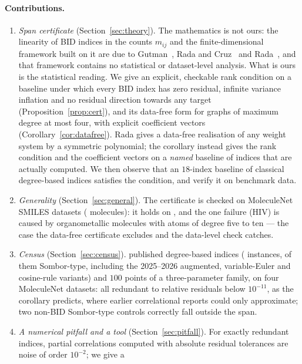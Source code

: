 \documentclass[11pt,a4paper]{article}
\theoremstyle{definition}
\begin{document}
\paragraph{Contributions.}
\begin{enumerate}[label=(\arabic*)]
\item \emph{Span certificate} (Section~\ref{sec:theory}). The
mathematics is not ours: the linearity of BID indices in the counts
$m_{ij}$ and the finite-dimensional framework built on it are due to
Gutman~\cite{Gutman2013Degree}, Rada and
Cruz~\cite{RadaCruz2014VDB} and Rada~\cite{Rada2026LinearVDB}, and that
framework contains no statistical or dataset-level analysis. What is
ours is the statistical reading. We give an explicit, checkable rank
condition on a baseline under which every BID index has zero residual,
infinite variance inflation and no residual direction towards any
target (Proposition~\ref{prop:cert}), and its data-free form for
graphs of maximum degree at most four, with explicit coefficient
vectors (Corollary~\ref{cor:datafree}). Rada gives a data-free
realisation of any weight system by a symmetric polynomial; the
corollary instead gives the rank condition and the coefficient vectors
on a \emph{named} baseline of indices that are actually computed. We
then observe that an $18$-index baseline of classical degree-based
indices satisfies the condition, and verify it on benchmark data.
\item \emph{Generality} (Section~\ref{sec:general}). The certificate
is checked on \nGenDatasets{} MoleculeNet SMILES datasets
(\nGenMolecules{} molecules): it holds on \nGenCertified{}, and the one
failure (HIV) is caused by \hivHyper{} organometallic molecules with
atoms of degree five to ten --- the case the data-free certificate
excludes and the data-level check catches.
\item \emph{Census} (Section~\ref{sec:census}). \nCensusIdx{} published
degree-based indices (\nCensusInst{} instances, \nSomborInst{} of them
Sombor-type, including the 2025--2026 augmented, variable-Euler and
cosine-rule variants) and $100$ points of a three-parameter family, on
four MoleculeNet datasets: all redundant to relative residuals below
$10^{-11}$, as the corollary predicts, where earlier correlational
reports could only approximate; two non-BID Sombor-type controls
correctly fall outside the span.
\item \emph{A numerical pitfall and a tool} (Section~\ref{sec:pitfall}).
For exactly redundant indices, partial correlations computed with
absolute residual tolerances are noise of order $10^{-2}$; we give a

\end{enumerate}
\end{document}
